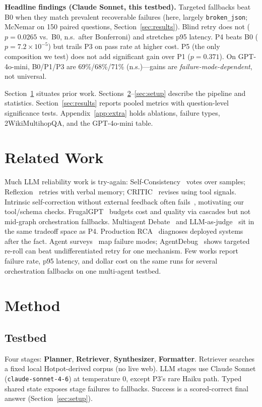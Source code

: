 \documentclass{article}
\begin{document}
\textbf{Headline findings (Claude Sonnet, this testbed).} Targeted fallbacks beat B0 when they match prevalent recoverable failures (here, largely \texttt{broken\_json}; McNemar on 150 paired questions, Section~\ref{sec:results}). Blind retry does not ($p{=}0.0265$ vs.\ B0, n.s.\ after Bonferroni) and stretches p95 latency. P4 beats B0 ($p{=}7.2\times 10^{-5}$) but trails P3 on pass rate at higher cost. P5 (the only composition we test) does not add significant gain over P1 ($p{=}0.371$). On GPT-4o-mini, B0/P1/P3 are 69\%/68\%/71\% (n.s.)---gains are \emph{failure-mode-dependent}, not universal.

Section~\ref{sec:related} situates prior work. Sections~\ref{sec:method}--\ref{sec:setup} describe the pipeline and statistics. Section~\ref{sec:results} reports pooled metrics with question-level significance tests. Appendix~\ref{app:extra} holds ablations, failure types, 2WikiMultihopQA, and the GPT-4o-mini table.

\section{Related Work}
\label{sec:related}

Much LLM reliability work is try-again: Self-Consistency~\citep{wang2023selfconsistency} votes over samples; Reflexion~\citep{shinn2023reflexion} retries with verbal memory; CRITIC~\citep{gou2024critic} revises using tool signals. Intrinsic self-correction without external feedback often fails~\citep{huang2024cannot,kamoi2024survey}, motivating our tool/schema checks. FrugalGPT~\citep{chen2024frugalgpt} budgets cost and quality via cascades but not mid-graph orchestration fallbacks. Multiagent Debate~\citep{du2024debate} and LLM-as-judge~\citep{zheng2023judge} sit in the same tradeoff space as P4. Production RCA~\citep{tan2026llrca,roy2024rca} diagnoses deployed systems after the fact. Agent surveys~\citep{wang2024agentsurvey,song2026failures} map failure modes; AgentDebug~\citep{zhu2025agentdebug} shows targeted re-roll can beat undifferentiated retry for one mechanism. Few works report failure rate, p95 latency, and dollar cost on the same runs for several orchestration fallbacks on one multi-agent testbed.

\section{Method}
\label{sec:method}

\subsection{Testbed}
Four stages: \textbf{Planner}, \textbf{Retriever}, \textbf{Synthesizer}, \textbf{Formatter}. Retriever searches a fixed local Hotpot-derived corpus (no live web). LLM stages use Claude Sonnet (\texttt{claude-sonnet-4-6}) at temperature 0, except P3's rare Haiku path. Typed shared state exposes stage failures to fallbacks. Success is a scored-correct final answer (Section~\ref{sec:setup}).
\end{document}
